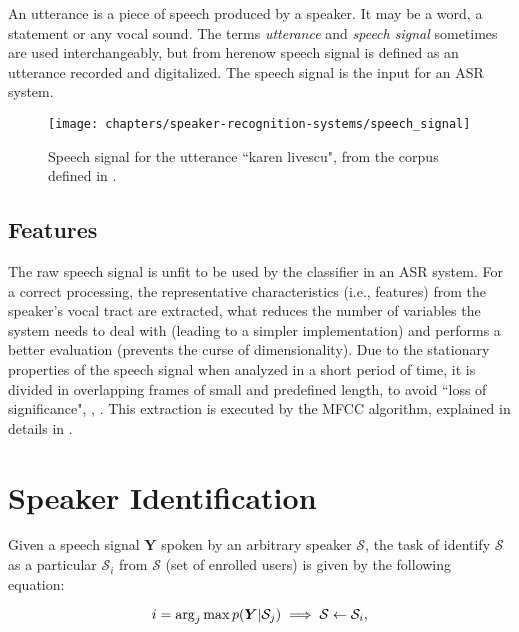 An utterance is a piece of speech produced by a speaker. It may be a word, a statement or any vocal sound. The terms \emph{utterance} and \emph{speech signal} sometimes are used interchangeably, but from herenow speech signal is defined as an utterance recorded and digitalized. The speech signal is the input for an ASR system.

\begin{figure}[ht]
    \centering
    \texttt{[image: chapters/speaker-recognition-systems/speech\_signal]}
    \caption{Speech signal for the utterance ``karen livescu", from the corpus defined in .}
    \label{fig:speech_signal}
\end{figure}

\subsection{Features}

The raw speech signal is unfit to be used by the classifier in an ASR system. For a correct processing, the representative characteristics (i.e., features) from the speaker's vocal tract are extracted, what reduces the number of variables the system needs to deal with (leading to a simpler implementation) and performs a better evaluation (prevents the curse of dimensionality). Due to the stationary properties of the speech signal when analyzed in a short period of time, it is divided in overlapping frames of small and predefined length, to avoid ``loss of significance", , . This extraction is executed by the MFCC algorithm, explained in details in .

\section{Speaker Identification}
\label{sec:speaker-identification}

Given a speech signal $\boldsymbol{Y}$ spoken by an arbitrary speaker $\mathcal{S}$, the task of identify $\mathcal{S}$ as a particular $\mathcal{S}_i$ from $\boldsymbol{\mathcal{S}}$ (set of enrolled users) is given by the following equation:

\begin{equation}
    i = \arg_j\max\postpdf{\boldsymbol{Y}}{\mathcal{S}_j} \implies \mathcal{S} \gets \mathcal{S}_i,
    \label{eq:classification_speaker_identification}
\end{equation}

